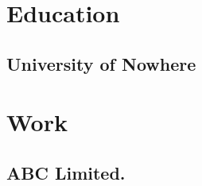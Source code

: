 \documentclass{my_cv}
\begin{document}
\section{Education}
\subsection{University of Nowhere}
\section{Work}
\subsection{ABC Limited.}


\end{document}
